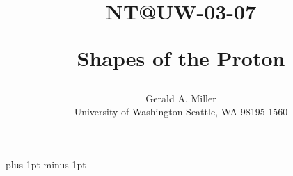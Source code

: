 \newcommand{\boldsigma}{\mbox{\boldmath $\sigma$}}
\newcommand {\boldgamma}{\mbox{\boldmath$\gamma$}}
\newcommand{\boldtau}{\mbox{\boldmath $\tau$}}
\newcommand{\bftau}{\mbox{\boldmath $\tau$}}
\newcommand{\bfx}{{\bf x}}
\newcommand{\bfy}{{\bf y}}
\newcommand{\bfP}{{\bf P}}
\def\poinc{Poincar\'{e} }
\def\bfq {{\bf q}}
\def\bfs {{\bf s}}
\def\bfn {{\bf n}}
\def\bfqp {{\bf q}_\perp}
\def\bfK{{\bf K}}
\def\bfKp{{\bf K}_\perp}
\def\bfL{{\bf L}}
\def\bfk{{\bf k}}
\def\bfp{{\bf p}}  
\newcommand{\bfkap}{\mbox{\boldmath $\kappa$}} 
\def\bfr{{\bf r}} 
\def\bfy{{\bf y}} 
\def\bfx{{\bf x}} 
\def\be{\begin{equation}}
 \def \ee{\end{equation}}
\def\bea{\begin{eqnarray}}
  \def\eea{\end{eqnarray}}
\newcommand{\eqn} {Eq.~(\ref )}
\newcommand{\bb}{\langle}
\newcommand{\kk}{\rangle}
\newcommand{\bk}[4]{\bb #1\,#2 \!\mid\! #3\,#4 \kk}
\newcommand{\kb}[4]{\mid\!#1\,#2 \!\mid}

\def\notp{{\not\! p}}
\def\notk{{\not\! k}}
\def\up{{\uparrow}}
\def\down{{\downarrow}}
\def\bfb{{\bf b}}
\tighten
\setlength{\textheight}{8.60in}
\setlength{\textwidth}{6.6in}
\setlength{\topmargin}{-.40in}
\setlength{\oddsidemargin}{-.125in}
\baselineskip=14pt plus 1pt minus 1pt

\def\poinc{Poincar\'{e} }
\def\bfq {{\bf q}}
\def\bfK{{\bf K}}
\def\bfL{{\bf L}}
\def\bfk{{\bf k}}
\def\bfp{{\bf p}}  
\def\be{\begin{equation}}
 \def \ee{\end{equation}}
\def\bea{\begin{eqnarray}}
  \def\eea{\end{eqnarray}}
\def\eqn {Eq.~(\ref )}




\newcommand{\kx}[2]{\mid\! #1\,#2 \kk}
\def\notp{{\not\! p}}
\def\notk{{\not\! k}}
\def\up{{\uparrow}}
\def\down{{\downarrow}}
\def\bfb{{\bf b}}


\title{\begin{flushright}{\normalsize NT@UW-03-07}\end{flushright}
Shapes of the Proton}
\author{Gerald A. Miller
\\ University of Washington
  Seattle, WA 98195-1560}

\sloppy



